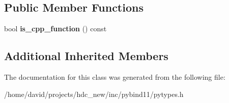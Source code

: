\subsection*{Public Member Functions}
\begin{DoxyCompactItemize}
\item 
bool {\bfseries is\+\_\+cpp\+\_\+function} () const \hypertarget{classfunction_a7ebf999efb8818f67a0506a4e8e98195}{}\label{classfunction_a7ebf999efb8818f67a0506a4e8e98195}

\end{DoxyCompactItemize}
\subsection*{Additional Inherited Members}


The documentation for this class was generated from the following file\+:\begin{DoxyCompactItemize}
\item 
/home/david/projects/hdc\+\_\+new/inc/pybind11/pytypes.\+h\end{DoxyCompactItemize}
